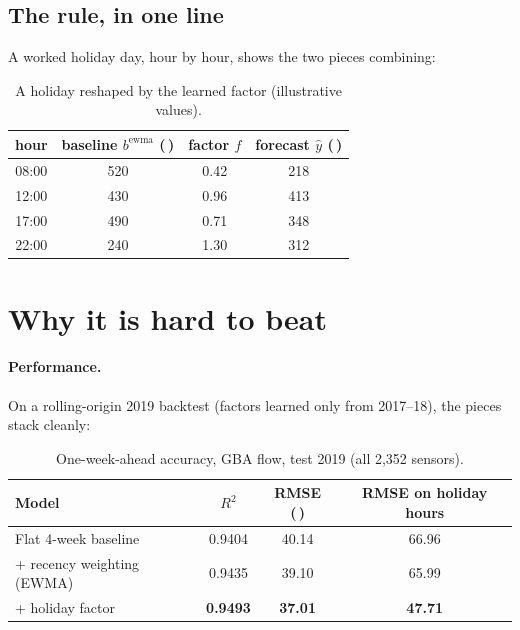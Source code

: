 \documentclass[11pt]{article}
\newcommand{\veh}{\,\text{veh/h}}
\begin{document}
\subsection{The rule, in one line}

\begin{center}
\end{center}

\noindent
A worked holiday day, hour by hour, shows the two pieces combining:

\begin{table}[H]\centering
\caption{A holiday reshaped by the learned factor (illustrative values).}
\begin{tabular}{cccc}
\toprule
hour & baseline $b^{\text{ewma}}$ (\veh) & factor $f$ & forecast $\hat y$ (\veh) \\
\midrule
08:00 & 520 & 0.42 & 218 \\
12:00 & 430 & 0.96 & 413 \\
17:00 & 490 & 0.71 & 348 \\
22:00 & 240 & 1.30 & 312 \\
\bottomrule
\end{tabular}
\end{table}

\section{Why it is hard to beat}

\paragraph{Performance.} On a rolling-origin 2019 backtest (factors learned only
from 2017--18), the pieces stack cleanly:

\begin{table}[H]\centering
\caption{One-week-ahead accuracy, GBA flow, test 2019 (all 2{,}352 sensors).}
\begin{tabular}{lccc}
\toprule
Model & $R^2$ & RMSE (\veh) & RMSE on holiday hours \\
\midrule
Flat 4-week baseline        & 0.9404 & 40.14 & 66.96 \\
\;+ recency weighting (EWMA)& 0.9435 & 39.10 & 65.99 \\
\;+ holiday factor          & \textbf{0.9493} & \textbf{37.01} & \textbf{47.71} \\
\bottomrule
\end{tabular}
\end{table}
\end{document}
